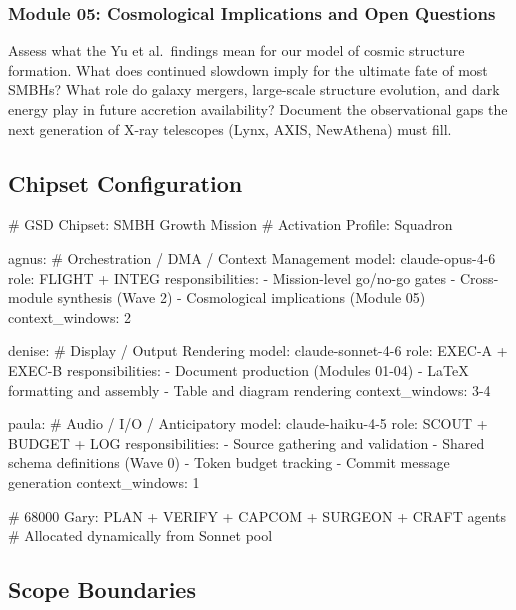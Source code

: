 \documentclass[11pt,letterpaper]{article}
\begin{document}
\subsubsection{Module 05: Cosmological Implications and Open Questions}

Assess what the Yu et al.\ findings mean for our model of cosmic structure formation. What does continued slowdown imply for the ultimate fate of most SMBHs? What role do galaxy mergers, large-scale structure evolution, and dark energy play in future accretion availability? Document the observational gaps the next generation of X-ray telescopes (Lynx, AXIS, NewAthena) must fill.

\subsection{Chipset Configuration}

\begin{asciibox}
# GSD Chipset: SMBH Growth Mission
# Activation Profile: Squadron

agnus:                          # Orchestration / DMA / Context Management
  model: claude-opus-4-6
  role: FLIGHT + INTEG
  responsibilities:
    - Mission-level go/no-go gates
    - Cross-module synthesis (Wave 2)
    - Cosmological implications (Module 05)
  context_windows: 2

denise:                         # Display / Output Rendering
  model: claude-sonnet-4-6
  role: EXEC-A + EXEC-B
  responsibilities:
    - Document production (Modules 01-04)
    - LaTeX formatting and assembly
    - Table and diagram rendering
  context_windows: 3-4

paula:                          # Audio / I/O / Anticipatory
  model: claude-haiku-4-5
  role: SCOUT + BUDGET + LOG
  responsibilities:
    - Source gathering and validation
    - Shared schema definitions (Wave 0)
    - Token budget tracking
    - Commit message generation
  context_windows: 1

# 68000 Gary: PLAN + VERIFY + CAPCOM + SURGEON + CRAFT agents
# Allocated dynamically from Sonnet pool
\end{asciibox}

\subsection{Scope Boundaries}
\end{document}

